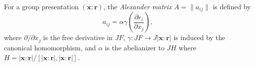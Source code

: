 For a group presentation $(\mathbf{x} : \mathbf{r})$, the \textit{Alexander matrix} $A = \|a_{ij}\|$ is defined by
$$a_{ij} = \alpha \gamma \left( \frac{\partial r_i}{\partial x_j} \right),$$
where $\partial/\partial x_j$ is the free derivative in $JF$, $\gamma: JF \to J|\mathbf{x} : \mathbf{r}|$ is induced by the canonical homomorphism, and $\alpha$ is the abelianizer to $JH$ where $H = |\mathbf{x} : \mathbf{r}| / [|\mathbf{x} : \mathbf{r}|, |\mathbf{x} : \mathbf{r}|]$.
